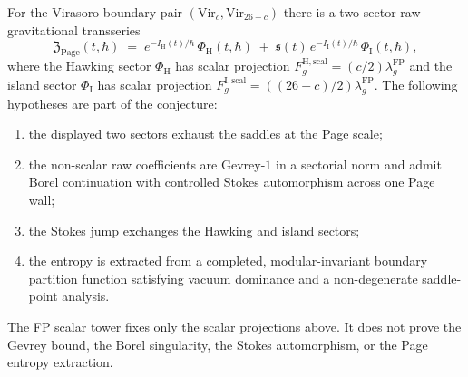 \begin{conjecture}
\label{conj:gravity-page-raw-transseries}
For the Virasoro boundary pair
$(\mathrm{Vir}_c,\mathrm{Vir}_{26-c})$ there is a two-sector
raw gravitational transseries
\[
\mathfrak Z_{\mathrm{Page}}(t,\hbar)
\;=\;
e^{-I_{\mathrm{H}}(t)/\hbar}\,
\Phi_{\mathrm{H}}(t,\hbar)
\;+\;
\mathfrak s(t)\,
e^{-I_{\mathrm{I}}(t)/\hbar}\,
\Phi_{\mathrm{I}}(t,\hbar),
\]
where the Hawking sector $\Phi_{\mathrm{H}}$ has scalar projection
$F_g^{\mathrm{H,scal}}=(c/2)\lambda_g^{\mathrm{FP}}$ and the island
sector $\Phi_{\mathrm{I}}$ has scalar projection
$F_g^{\mathrm{I,scal}}=((26-c)/2)\lambda_g^{\mathrm{FP}}$. The
following hypotheses are part of the conjecture:
\begin{enumerate}[label=\textup{(\roman*)}]
\item the displayed two sectors exhaust the saddles at the Page
 scale;
\item the non-scalar raw coefficients are Gevrey-$1$ in a
 sectorial norm and admit Borel continuation with controlled
 Stokes automorphism across one Page wall;
\item the Stokes jump exchanges the Hawking and island sectors;
\item the entropy is extracted from a completed, modular-invariant
 boundary partition function satisfying vacuum dominance and a
 non-degenerate saddle-point analysis.
\end{enumerate}
The FP scalar tower fixes only the scalar projections above. It does
not prove the Gevrey bound, the Borel singularity, the Stokes
automorphism, or the Page entropy extraction.
\end{conjecture}

